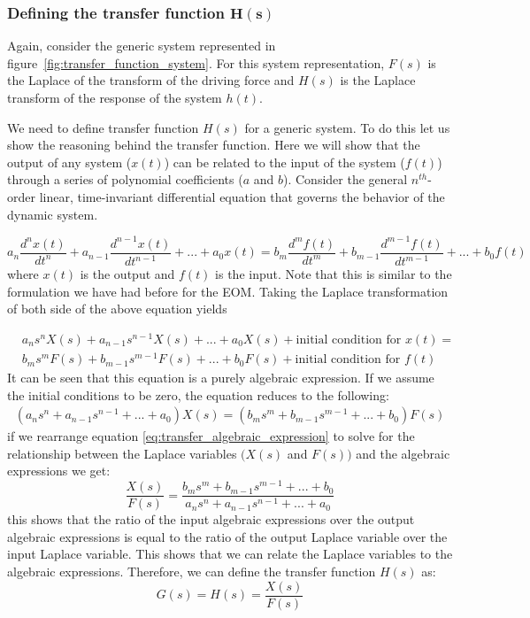 \documentclass[12pt,letter]{article}
\begin{document}
\subsubsection{Defining the transfer function $\mathbf{H(s)}$}

Again, consider the generic system represented in figure~\ref{fig:transfer_function_system}. For this system representation, $F(s)$ is the Laplace of the transform of the driving force and $H(s)$ is the Laplace transform of the response of the system $h(t)$. 

We need to define transfer function $H(s)$ for a generic system. To do this let us show the reasoning behind the transfer function. Here we will show that the output of any system ($x(t)$) can be related to the input of the system ($f(t)$) through a series of polynomial coefficients ($a$ and $b$). Consider the general $n^{th}$-order linear, time-invariant differential equation that governs the behavior of the dynamic system.

\begin{equation}
a_n\frac{d^nx(t)}{dt^n} + a_{n-1}\frac{d^{n-1}x(t)}{dt^{n-1}} + ... + a_0x(t) = b_m\frac{d^mf(t)}{dt^m} + b_{m-1}\frac{d^{m-1}f(t)}{dt^{m-1}} + ... + b_0f(t)
\end{equation} 
where $x(t)$ is the output and $f(t)$ is the input. Note that this is similar to the formulation we have had before for the EOM. Taking the Laplace transformation of both side of the above equation yields

\begin{eqnarray}
&a_ns^nX(s) + a_{n-1}s^{n-1}X(s) + ... + a_0X(s) + \text{initial condition for } x(t) =   \\
&b_ms^mF(s) + b_{m-1}s^{m-1}F(s) + ... + b_0F(s) + \text{initial condition for } f(t)  \nonumber
\label{eq:transfer_function_polynominal_expansion}
\end{eqnarray}
It can be seen that this equation is a purely algebraic expression. If we assume the initial conditions to be zero, the equation reduces to the following:
\begin{eqnarray}
(a_ns^n + a_{n-1}s^{n-1} + ... + a_0)X(s) =  (b_ms^m + b_{m-1}s^{m-1} + ... + b_0)F(s) 
\label{eq:transfer_algebraic_expression}
\end{eqnarray}
if we rearrange equation \ref{eq:transfer_algebraic_expression} to solve for the relationship between the Laplace variables $\big( X(s)$ and $F(s) \big)$ and the algebraic expressions we get:
\begin{equation}
\frac{X(s)}{F(s)} = \frac{b_ms^m + b_{m-1}s^{m-1} + ... + b_0}{a_ns^n + a_{n-1}s^{n-1} + ... + a_0}
\end{equation}
this shows that the ratio of the input algebraic expressions over the output algebraic expressions is equal to the ratio of the output Laplace variable over the input Laplace variable. This shows that we can relate the Laplace variables to the algebraic expressions. Therefore, we can define the transfer function $H(s)$ as: 
\begin{equation}
G(s) = H(s) = \frac{X(s)}{F(s)}
\label{eq:transfer_function}
\end{equation}
\end{document}
